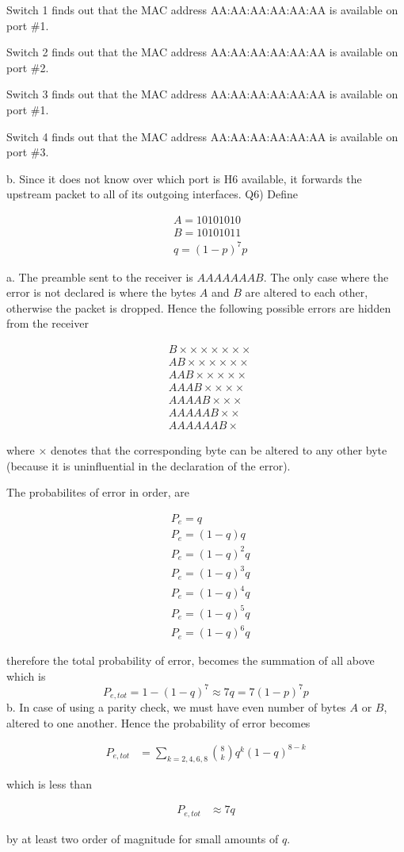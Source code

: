 \documentclass[10pt,letterpaper]{article}
\newcommand{\eqn}[2]{
\begin{equation}
\begin{split}
#1
\label{#2}
\end{split}
\end{equation}
}
\begin{document}
Switch 1 finds out that the MAC address AA:AA:AA:AA:AA:AA is available on port \#1.

Switch 2 finds out that the MAC address AA:AA:AA:AA:AA:AA is available on port \#2.

Switch 3 finds out that the MAC address AA:AA:AA:AA:AA:AA is available on port \#1.

Switch 4 finds out that the MAC address AA:AA:AA:AA:AA:AA is available on port \#3.

b. Since it does not know over which port is H6 available, it forwards the upstream packet to all of its outgoing interfaces.
\newline\newline
Q6) Define 
\eqn{
&A=10101010
\\&B=10101011
\\&q=(1-p)^7p
}{}
a. The preamble sent to the receiver is $AAAAAAAB$. The only case where the error is not declared is where the bytes $A$ and $B$ are altered to each other, otherwise the packet is dropped. Hence the following possible errors are hidden from the receiver
\eqn{
&B\times\times\times\times\times\times\times
\\&AB\times\times\times\times\times\times
\\&AAB\times\times\times\times\times
\\&AAAB\times\times\times\times
\\&AAAAB\times\times\times
\\&AAAAAB\times\times
\\&AAAAAAB\times
}{}
where $\times$ denotes that the corresponding byte can be altered to any other byte (because it is uninfluential in the declaration of the error).

The probabilites of error in order, are
\eqn{
&P_e=q
\\&P_e=(1-q)q
\\&P_e=(1-q)^2q
\\&P_e=(1-q)^3q
\\&P_e=(1-q)^4q
\\&P_e=(1-q)^5q
\\&P_e=(1-q)^6q
}{}
therefore the total probability of error, becomes the summation of all above which is
$$
P_{e,tot}=1-(1-q)^7\approx 7q=7(1-p)^7p
$$
b. In case of using a parity check, we must have even number of bytes $A$ or $B$, altered  to one another. Hence the probability of error becomes
\eqn{
P_{e,tot}&=\sum_{k=2,4,6,8}\binom{8}{k}q^k(1-q)^{8-k}
}{}
which is less than
\eqn{
P_{e,tot}&\approx7q
}{}
by at least two order of magnitude for small amounts of $q$.
\end{document}
